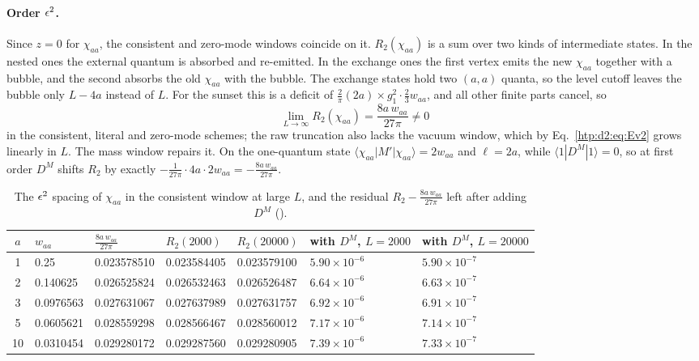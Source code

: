 \paragraph{Order $\epsilon^2$.}\label{htp:d2:app:desc2} Since $z=0$ for $\chi_{aa}$, the consistent and zero-mode windows coincide on
it. $R_2(\chi_{aa})$ is a sum over two kinds of intermediate states. In the nested ones the external quantum is absorbed and
re-emitted. In the exchange ones the first vertex emits the new $\chi_{aa}$ together with a bubble, and the second absorbs
the old $\chi_{aa}$ with the bubble. The exchange states hold two $(a,a)$ quanta, so the level cutoff leaves the bubble only
$L-4a$ instead of $L$. For the sunset this is a deficit of $\frac2\pi(2a)\times g_1^2\cdot\frac23w_{aa}$, and all other finite
parts cancel, so
\begin{equation}
 \lim_{L\to\infty}R_2(\chi_{aa})=\frac{8a\,w_{aa}}{27\pi}\neq0
\end{equation}
in the consistent, literal and zero-mode schemes; the raw truncation also lacks the vacuum window, which by
Eq.~\eqref{htp:d2:eq:Ev2} grows linearly in $L$. The mass window repairs it. On the one-quantum state
$\langle\chi_{aa}|M'|\chi_{aa}\rangle=2w_{aa}$ and $\ell=2a$, while $\langle1|D^M|1\rangle=0$, so at first order $D^M$ shifts $R_2$ by
exactly $-\frac1{27\pi}\cdot4a\cdot2w_{aa}=-\frac{8a\,w_{aa}}{27\pi}$.

\begin{table}[ht]
\centering\footnotesize\renewcommand{\arraystretch}{1.15}
\begin{tabular}{@{}cllllll@{}}
\toprule
$a$ & $w_{aa}$ & $\frac{8a\,w_{aa}}{27\pi}$ & $R_2(2000)$ & $R_2(20000)$ & with $D^M$, $L=2000$ & with $D^M$, $L=20000$ \\\midrule
1 & 0.25 & 0.023578510 & 0.023584405 & 0.023579100 & $5.90\times10^{-6}$ & $5.90\times10^{-7}$ \\
2 & 0.140625 & 0.026525824 & 0.026532463 & 0.026526487 & $6.64\times10^{-6}$ & $6.63\times10^{-7}$ \\
3 & 0.0976563 & 0.027631067 & 0.027637989 & 0.027631757 & $6.92\times10^{-6}$ & $6.91\times10^{-7}$ \\
5 & 0.0605621 & 0.028559298 & 0.028566467 & 0.028560012 & $7.17\times10^{-6}$ & $7.14\times10^{-7}$ \\
10 & 0.0310454 & 0.029280172 & 0.029287560 & 0.029280905 & $7.39\times10^{-6}$ & $7.33\times10^{-7}$ \\
\bottomrule
\end{tabular}
\caption{The $\epsilon^2$ spacing of $\chi_{aa}$ in the consistent window at large $L$, and the residual
$R_2-\frac{8a\,w_{aa}}{27\pi}$ left after adding $D^M$ ().}
\label{htp:d2:tab:desc2}
\end{table}

